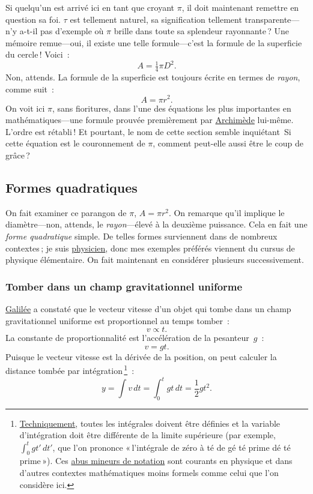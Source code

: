 Si quelqu'un est arrivé ici en tant que croyant $\pi$, il doit maintenant
remettre en question sa foi. $\tau$ est tellement naturel, sa signification
tellement transparente---n'y a-t-il pas d'exemple où $\pi$ brille dans toute sa
splendeur rayonnante\,? Une mémoire remue---oui, il existe une telle
formule---c'est la formule de la superficie du cercle\,! Voici~:
\[ A = \tfrac{1}{4} \pi D^2. \]
Non, attends. La formule de la superficie est toujours écrite en termes de
\emph{rayon}, comme suit~:
\[ A = \pi r^2. \]
On voit ici $\pi$, sans fioritures, dans l'une des équations les plus
importantes en mathématiques---une formule prouvée premièrement par
\href{https://fr.wikipedia.org/wiki/Archimède}{Archimède} lui-même. L'ordre est
rétabli\,! Et pourtant, le nom de cette section semble inquiétant\textellipsis\
Si cette équation est le couronnement de $\pi$, comment peut-elle aussi être le
coup de grâce\,?


  \subsection{Formes quadratiques} %
  \label{sec:quadratic_forms}

On fait examiner ce parangon de $\pi$, $A = \pi r^2$. On remarque qu'il implique
le diamètre---non, attends, le \emph{rayon}---élevé à la deuxième puissance.
Cela en fait une \emph{forme quadratique} simple. De telles formes surviennent
dans de nombreux contextes\,; je suis
\href{https://thesis.library.caltech.edu/1940/}{physicien}, donc mes exemples
préférés viennent du cursus de physique élémentaire. On fait maintenant en
considérer plusieurs successivement.

    \subsubsection{Tomber dans un champ gravitationnel uniforme} %
    \label{sec:falling_in_a_uniform_gravitational_field}

\href{https://fr.wikipedia.org/wiki/Galil%C3%A9e_(savant)}{Galilée} a constaté
que le vecteur vitesse d'un objet qui tombe dans un champ gravitationnel
uniforme est proportionnel au temps tomber~:
\[ v \propto t. \]
La constante de proportionnalité est l'accélération de la pesanteur~$g$~:
\[ v = g t. \]
Puisque le vecteur vitesse est la dérivée de la position, on peut calculer la
distance tombée par
intégration\,\footnote{\href{https://bit.ly/32mB2CF}{Techniquement}, toutes les
intégrales doivent être définies et la variable d'intégration doit être
différente de la limite supérieure (par exemple, $\int_{0}^{t} gt'\, dt'$, que
l'on prononce «\,l'intégrale de zéro à té de gé té prime dé té prime\,»). Ces
\href{https://fr.wikipedia.org/wiki/Abus_de_notation}{abus mineurs de notation}
sont courants en physique et dans d'autres contextes mathématiques moins formels
comme celui que l'on considère ici.}~:
\[ y = \int v\,dt = \int_0^t gt\,dt = \textstyle{\frac{1}{2}} gt^2. \]


